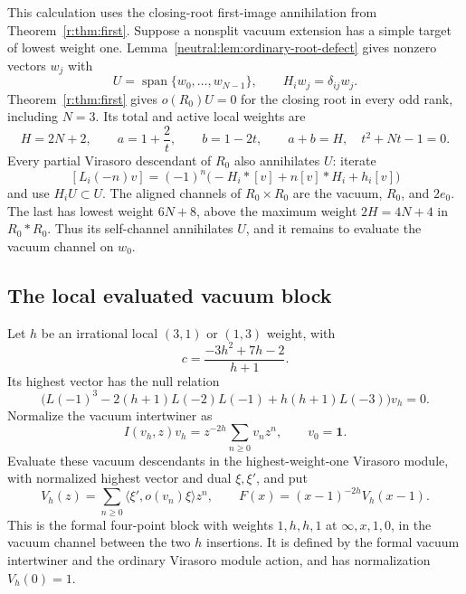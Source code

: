 \documentclass[11pt,a4paper]{article}
\numberwithin{equation}{section}
\theoremstyle{definition}\newtheorem{definition}[theorem]{Definition}
\theoremstyle{remark}\newtheorem{remark}[theorem]{Remark}
\begin{document}
This calculation uses the closing-root first-image annihilation
from Theorem~\ref{r:thm:first}.
Suppose a nonsplit vacuum extension has a simple target of lowest weight
one.  Lemma~\ref{neutral:lem:ordinary-root-defect} gives nonzero vectors
$w_j$ with
\[
 U=\operatorname{span}\{w_0,\ldots,w_{N-1}\},\qquad
 H_iw_j=\delta_{ij}w_j.
\]
Theorem~\ref{r:thm:first} gives $o(R_0)U=0$ for the closing root
in every odd rank, including $N=3$.  Its total and active local
weights are
\[
 H=2N+2,\qquad a=1+\frac2t,\qquad b=1-2t,
 \qquad a+b=H,\quad t^2+Nt-1=0.
\]
Every partial Virasoro descendant of $R_0$ also annihilates $U$: iterate
\[
 [L_i(-n)v]=(-1)^n\bigl(-H_i*[v]+n[v]*H_i+h_i[v]\bigr)
\]
and use $H_iU\subset U$.  The aligned channels of $R_0\times R_0$ are
the vacuum, $R_0$, and $2e_0$.  The last has lowest weight $6N+8$, above
the maximum weight $2H=4N+4$ in $R_0*R_0$.  Thus its self-channel
annihilates $U$, and it remains to evaluate the vacuum channel on $w_0$.

\subsection{The local evaluated vacuum block}

Let $h$ be an irrational local $(3,1)$ or $(1,3)$ weight, with
\[
 c=\frac{-3h^2+7h-2}{h+1}.
\]
Its highest vector has the null relation
\begin{equation}
 \bigl(L(-1)^3-2(h+1)L(-2)L(-1)+h(h+1)L(-3)\bigr)v_h=0.
 \label{r:eq:heavy-null}
\end{equation}
Normalize the vacuum intertwiner as
\[
 I(v_h,z)v_h=z^{-2h}\sum_{n\geq0}v_nz^n,\qquad v_0=\mathbf1.
\]
Evaluate these vacuum descendants in the highest-weight-one Virasoro
module, with normalized highest vector and dual $\xi,\xi'$, and put
\[
 V_h(z)=\sum_{n\geq0}\langle \xi',o(v_n)\xi\rangle z^n,
 \qquad F(x)=(x-1)^{-2h}V_h(x-1).
\]
This is the formal four-point block with weights $1,h,h,1$ at
$\infty,x,1,0$, in the vacuum channel between the two $h$ insertions.
It is defined by the formal vacuum intertwiner and the ordinary Virasoro
module action, and has normalization $V_h(0)=1$.
\end{document}
